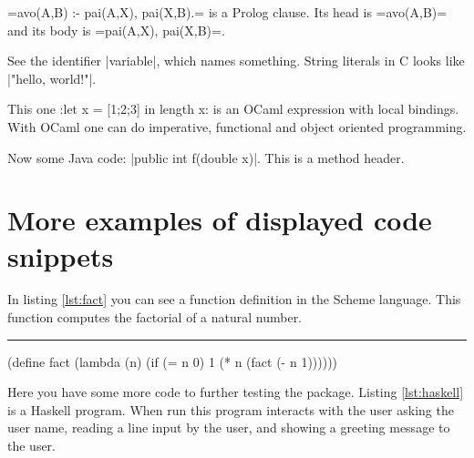 \documentclass[10pt,a4paper]{article}
\begin{document}
\begin{Example}
  \pyginline[lang=prolog,colback=yellow]=avo(A,B) :- pai(A,X), pai(X,B).=
  is a Prolog clause. Its head is
  \pyginline[lang=prolog,sty=emacs,colback=yellow,linecolor=red]=avo(A,B)=
  and its body is
  \pyginline[lang=prolog,sty=vim,colback=black,hidealllines]=pai(A,X), pai(X,B)=.
\end{Example}

\begin{Example}
  See the identifier \pyginline[inline method=efbox,colback=green!25]|variable|,
  which names something. String literals in C looks like
  \pyginline[lang=c,inline method=tcbox,colback=blue!20,boxrule=2pt]|"hello, world!\n"|.
\end{Example}


\begin{Example}
  This one
  \pyginline[lang=ocaml,font=\ttfamily\scriptsize,topline=false]:let x = [1;2;3] in length x:
  is an OCaml expression with local bindings. With OCaml one can do
  imperative, functional and object oriented programming.
\end{Example}

\begin{Example}
  Now some Java code:
  \pyginline[lang=java,sty=colorful,font=\ttfamily\itshape,linewidth=1pt]|public int f(double x)|.
  This is a method header.
\end{Example}

\section{More examples of displayed code snippets}


In listing \ref{lst:fact} you can see a function definition in the
Scheme language. This function computes the factorial of a natural
number.
\newline\rule{\linewidth}{2pt}
\begin{pygmented}[
  sty=emacs,
  linenos,
  label=lst:fact,
  caption=A Scheme function.
  ]
(define fact
    (lambda (n)
        (if (= n 0)
            1
            (* n (fact (- n 1))))))
\end{pygmented}

Here you have some more code to further testing the package. Listing
\ref{lst:haskell} is a Haskell program. When run this program interacts
with the user asking the user name, reading a line input by the user,
and showing a greeting message to the user.
\end{document}

